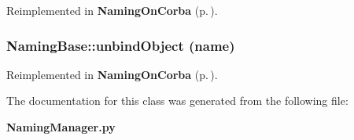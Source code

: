 Reimplemented in {\bf Naming\-On\-Corba} {\rm (p.\,\pageref{classNamingOnCorba_NamingOnCorbaa1})}.
\subsubsection{\setlength{\rightskip}{0pt plus 5cm}Naming\-Base::unbind\-Object (name)}\label{classNamingBase_NamingBasea2}




Reimplemented in {\bf Naming\-On\-Corba} {\rm (p.\,\pageref{classNamingOnCorba_NamingOnCorbaa2})}.

The documentation for this class was generated from the following file:\begin{CompactItemize}
\item 
{\bf Naming\-Manager.py}\end{CompactItemize}

